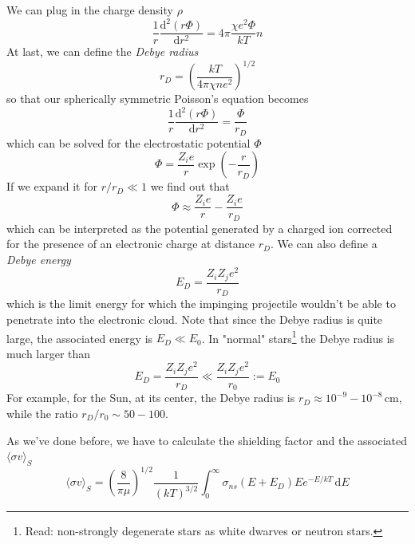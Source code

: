 We can plug in the charge density $\rho$
\begin{equation*}
    \frac{1}{r}\frac{\text{d}^{2}(r\Phi)}{\text{d}r^{2}} = 4\pi\frac{\chi e^{2}\Phi}{kT}n
\end{equation*}
At last, we can define the \emph{Debye radius}
\begin{equation}
    r_{D} = \left(\frac{kT}{4\pi\chi ne^{2}}\right)^{1/2}
    \label{eq:debyeradius}
\end{equation}
so that our spherically symmetric Poisson's equation becomes 
\begin{equation*}
     \frac{1}{r}\frac{\text{d}^{2}(r\Phi)}{\text{d}r^{2}} = \frac{\Phi}{r_{D}}
\end{equation*}
which can be solved for the electrostatic potential $\Phi$
\begin{equation*}
    \Phi = \frac{Z_{i}e}{r}\exp\left(-\frac{r}{r_{D}}\right)
\end{equation*}
If we expand it for $r/r_{D}\ll 1$ we find out that 
\begin{equation}
    \Phi \approx \frac{Z_{i}e}{r}-\frac{Z_{i}e}{r_{D}}
\end{equation}
which can be interpreted as the potential generated by a charged ion corrected for the presence of an electronic charge at distance $r_{D}$. We can also define a \emph{Debye energy}
\begin{equation}
    E_{D} = \frac{Z_{i}Z_{j}e^{2}}{r_{D}}
    \label{eq:debyeenergy}
\end{equation}
which is the limit energy for which the impinging projectile wouldn't be able to penetrate into the electronic cloud. Note that since the Debye radius is quite large, the associated energy is $E_{D}\ll E_{0}$. In "normal" stars\footnote{Read: non-strongly degenerate stars as white dwarves or neutron stars.} the Debye radius is much larger than
\begin{equation*}
    E_{D}=\frac{Z_{i}Z_{j}e^{2}}{r_{D}}\ll\frac{Z_{i}Z_{j}e^{2}}{r_{0}} := E_{0}
\end{equation*}
For example, for the Sun, at its center, the Debye radius is $r_{D}\approx 10^{-9}-10^{-8}\,\text{cm}$, while the ratio $r_{D}/r_{0}\sim 50-100$.
\par As we've done before, we have to calculate the shielding factor and the associated $\langle \sigma v\rangle_{S}$
\begin{equation*}
    \langle \sigma v\rangle_{S} = \left(\frac{8}{\pi\mu}\right)^{1/2}\frac{1}{(kT)^{3/2}}\int_{0}^{\infty}\sigma_{ns}(E+E_{D})Ee^{-E/kT}\,\text{d}E
\end{equation*}
